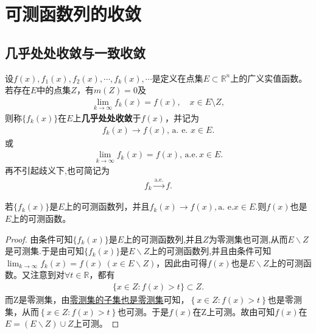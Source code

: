 \documentclass[../../main.tex]{subfiles}%
\begin{document}
\section{可测函数列的收敛}

\subsection{几乎处处收敛与一致收敛}

\begin{definition}[几乎处处收敛]
设$f(x), f_1(x), f_2(x), \cdots, f_k(x), \cdots$是定义在点集$E \subset \mathbb{R}^n$上的广义实值函数。若存在$E$中的点集$Z$，有$m(Z) = 0$及
\begin{align*}
\lim_{k \to \infty} f_k(x) = f(x), \quad x \in E \setminus Z,
\end{align*}
则称$\{f_k(x)\}$在$E$上\textbf{几乎处处收敛}于$f(x)$，并记为
\begin{align*}
f_k(x) \to f(x),\,\text{a. e. } x \in E.
\end{align*}
或
\begin{align*}
\lim_{k \to \infty} f_k(x) = f(x),\,\text{a.e.}\, x \in E.
\end{align*}
再不引起歧义下,也可简记为
\begin{align*}
f_k\xrightarrow{\mathrm{a}.\mathrm{e}.}f.
\end{align*}
\end{definition}

\begin{theorem}
若$\{f_k(x)\}$是$E$上的可测函数列，并且$f_k(x) \to f(x),\text{a. e.} x \in E.$则$f(x)$也是$E$上的可测函数。
\end{theorem}
\begin{proof}
由条件可知\(\{ f_k(x) \}\)是\(E\)上的可测函数列,并且$Z$为零测集也可测,从而\(E\backslash Z\)是可测集.于是由可知\(\{ f_k(x) \}\)是\(E\backslash Z\)上的可测函数列,并且由条件可知\(\lim_{k\rightarrow \infty}f_k(x) =f(x) \ (x\in E\backslash Z)\)，因此由可得\(f(x)\)也是\(E\backslash Z\)上的可测函数。又注意到对\(\forall t\in \mathbb{R}\)，都有
\begin{align*}
\{ x\in Z:f (x) >t \} \subset Z.
\end{align*}
而Z是零测集，由\hyperref[proposition:零测集的基本性质]{零测集的子集也是零测集}可知，\(\left\{ x\in Z:f(x) >t \right\}\)也是零测集，从而\(\left\{ x\in Z:f(x) >t \right\}\)也可测。于是\(f(x)\)在Z上可测。故由可知\(f(x)\)在\(E=(E\backslash Z)\cup Z\)上可测。
\end{proof}
\end{document}
